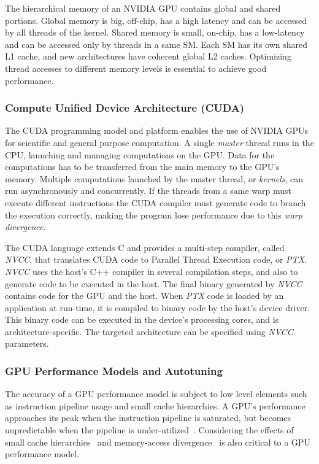 The hierarchical memory of an NVIDIA GPU contains global and shared portions.
Global memory is big, off-chip, has a high latency and can be accessed by all
threads of the kernel.  Shared memory is small, on-chip, has a low-latency and
can be accessed only by threads in a same SM.  Each SM has its own shared L1
cache, and new architectures have coherent global L2 caches.  Optimizing thread
accesses to different memory levels is essential to achieve good performance.

\subsubsection{Compute Unified Device Architecture (CUDA)}

The CUDA programming model and platform enables the use of NVIDIA GPUs for
scientific and general purpose computation.  A single \textit{master} thread
runs in the CPU, launching and managing computations on the GPU.  Data for the
computations has to be transferred from the main memory to the GPU's memory.
Multiple computations launched by the master thread, or \textit{kernels}, can
run asynchronously and concurrently. If the threads from a same warp must
execute different instructions the CUDA compiler must generate code to branch
the execution correctly, making the program lose performance due to this
\textit{warp divergence}.

The CUDA language extends C and provides a multi-step compiler, called
\textit{NVCC}, that translates CUDA code to Parallel Thread Execution code, or
\textit{PTX}.  \textit{NVCC} uses the host's C++ compiler in several
compilation steps, and also to generate code to be executed in the host. The
final binary generated by \textit{NVCC} contains code for the GPU and the host.
When \textit{PTX} code is loaded by an application at run-time, it is compiled
to binary code by the host's device driver.  This binary code can be executed
in the device's processing cores, and is architecture-specific.  The targeted
architecture can be specified using \textit{NVCC} parameters.

\subsubsection{GPU Performance Models and Autotuning}

The accuracy of a GPU performance model is subject to low level elements such
as instruction pipeline usage and small cache hierarchies. A GPU's performance
approaches its peak when the instruction pipeline is saturated, but becomes
unpredictable when the pipeline is
under-utilized~\cite{zhang2011quantitative,amaris2015simple}.  Considering the
effects of small cache hierarchies~\cite{dao2015performance,picchi2015impact}
and memory-access
divergence~\cite{sampaio2013divergence,baghsorkhi2010adaptive} is also critical
to a GPU performance model.


